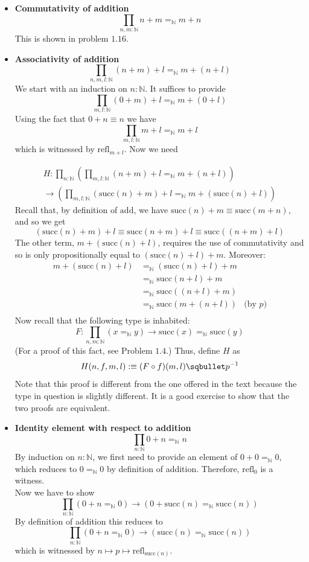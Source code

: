 \documentclass[14pt]{extarticle}
\newcommand{\N}{{\mathbb N}}
\newcommand{\0}{{\mathbf 0}}
\newcommand{\1}{{\mathbf 1}}
\newcommand{\2}{{\mathbf 2}}
\newcommand{\mt}{\mapsto}
\newcommand{\su}{\mathrm{succ}}
\newcommand{\add}{\mathrm{add}}
\newcommand{\refl}{\mathrm{refl}}
\begin{document}
\begin{itemize}
\item \textbf{Commutativity of addition}
\[\prod_{n,m : \N}n+m =_\N m+n\] This is shown in problem $1.16$.
\item \textbf{Associativity of addition}
\[\prod_{n,m,l : \N}(n+m) + l =_\N m+(n + l)\]
We start with an induction on $n:\N$. It suffices to provide 
\[\prod_{m,l : \N}(0+m) + l =_\N m+(0 + l)\] Using the fact that $0 + n \equiv n$ we have 
\[\prod_{m,l : \N}m + l =_\N m+l\] which is witnessed by $\refl_{m+l}$. Now we need 


\begin{multline*}
H : \prod_{n:\N} \left(\prod_{m,l: \N}(n+m) + l =_\N m+(n + l) \right) \\
\to \left(\prod_{m,l : \N}(\su(n)+m) + l =_\N m+(\su(n) + l) \right)
\end{multline*}
Recall that, by definition of $\add$, we have $\su(n) + m \equiv \su(m+n)$, and so we get
\[(\su(n) + m) + l \equiv \su(n + m) + l \equiv \su((n+m) + l)\] The other term, $m + (\su(n) + l)$, requires the use of commutativity and so is only propositionally equal to $(\su(n) + l) + m$. Moreover:
\begin{align*}
m + (\su(n) + l) &=_\N (\su(n) + l) + m \\
&=_\N \su(n + l) + m \\
&=_\N \su((n + l) + m) \\
&=_\N \su(m + (n + l)) &\text{(by $p$)}\\
\end{align*}
Now recall that the following type is inhabited:
\[F : \prod_{n,m:\N} (x =_\N y) \to \su(x) =_\N \su(y)\] (For a proof of this fact, see Problem $1.4$.) Thus, define $H$ as
\[H(n,f,m,l) :\equiv (F \circ f)(m,l) \sqbullet p^{-1}\]
Note that this proof is different from the one offered in the text because the type in question is slightly different. It is a good exercise to show that the two proofs are equivalent.


\item \textbf{Identity element with respect to addition}
\[\prod_{n: \N}0+n =_\N n\]
By induction on $n:\N$, we first need to provide an element of $0+0 =_\N 0$, which reduces to $0 =_\N 0$ by definition of addition. Therefore, $\refl_0$ is a witness.\\
Now we have to show 
\[\prod_{n:\N}(0 + n =_\N 0) \to (0 + \su(n) =_\N \su(n))\]
By definition of addition this reduces to 
\[\prod_{n:\N}(0 + n =_\N 0) \to (\su(n) =_\N \su(n))\] which is witnessed by $n \mt p \mt \refl_{\su(n)}$.



\end{itemize}
\end{document}
